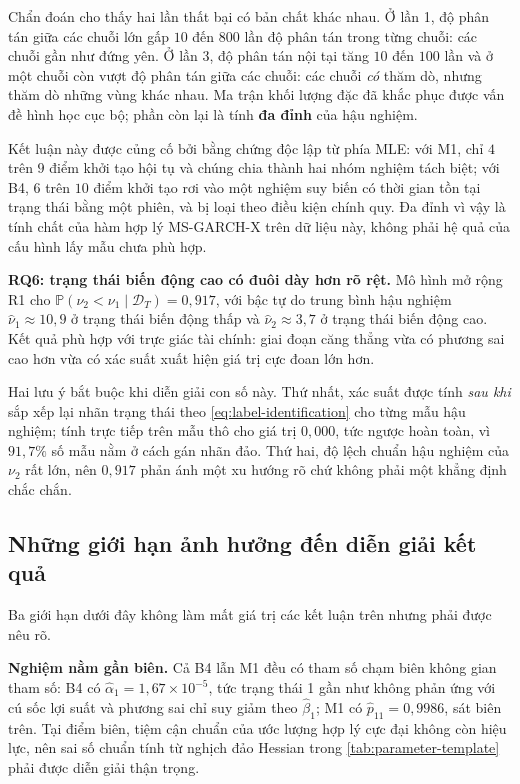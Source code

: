 \documentclass[12pt,a4paper]{article}
\numberwithin{equation}{section}
\newcommand{\Data}{\mathcal{D}}
\newcommand{\Prob}{\mathbb{P}}
\newcommand{\RQ}[1]{\textbf{RQ#1}}
\begin{document}
Chẩn đoán cho thấy hai lần thất bại có bản chất khác nhau. Ở lần 1, độ phân tán giữa các chuỗi lớn gấp $10$ đến $800$ lần độ phân tán trong từng chuỗi: các chuỗi gần như đứng yên. Ở lần 3, độ phân tán nội tại tăng $10$ đến $100$ lần và ở một chuỗi còn vượt độ phân tán giữa các chuỗi: các chuỗi \emph{có} thăm dò, nhưng thăm dò những vùng khác nhau. Ma trận khối lượng đặc đã khắc phục được vấn đề hình học cục bộ; phần còn lại là tính \textbf{đa đỉnh} của hậu nghiệm.

Kết luận này được củng cố bởi bằng chứng độc lập từ phía MLE: với M1, chỉ $4$ trên $9$ điểm khởi tạo hội tụ và chúng chia thành hai nhóm nghiệm tách biệt; với B4, $6$ trên $10$ điểm khởi tạo rơi vào một nghiệm suy biến có thời gian tồn tại trạng thái bằng một phiên, và bị loại theo điều kiện chính quy. Đa đỉnh vì vậy là tính chất của hàm hợp lý MS-GARCH-X trên dữ liệu này, không phải hệ quả của cấu hình lấy mẫu chưa phù hợp.

\textbf{\RQ{6}: trạng thái biến động cao có đuôi dày hơn rõ rệt.} Mô hình mở rộng R1 cho $\Prob(\nu_2<\nu_1\mid\Data_T) = 0{,}917$, với bậc tự do trung bình hậu nghiệm $\hat\nu_1 \approx 10{,}9$ ở trạng thái biến động thấp và $\hat\nu_2 \approx 3{,}7$ ở trạng thái biến động cao. Kết quả phù hợp với trực giác tài chính: giai đoạn căng thẳng vừa có phương sai cao hơn vừa có xác suất xuất hiện giá trị cực đoan lớn hơn.

Hai lưu ý bắt buộc khi diễn giải con số này. Thứ nhất, xác suất được tính \emph{sau khi} sắp xếp lại nhãn trạng thái theo \cref{eq:label-identification} cho từng mẫu hậu nghiệm; tính trực tiếp trên mẫu thô cho giá trị $0{,}000$, tức ngược hoàn toàn, vì $91{,}7\%$ số mẫu nằm ở cách gán nhãn đảo. Thứ hai, độ lệch chuẩn hậu nghiệm của $\nu_2$ rất lớn, nên $0{,}917$ phản ánh một xu hướng rõ chứ không phải một khẳng định chắc chắn.

\subsection{Những giới hạn ảnh hưởng đến diễn giải kết quả}\label{subsec:gioi-han-dien-giai}

Ba giới hạn dưới đây không làm mất giá trị các kết luận trên nhưng phải được nêu rõ.

\textbf{Nghiệm nằm gần biên.} Cả B4 lẫn M1 đều có tham số chạm biên không gian tham số: B4 có $\hat\alpha_1 = 1{,}67\times10^{-5}$, tức trạng thái 1 gần như không phản ứng với cú sốc lợi suất và phương sai chỉ suy giảm theo $\hat\beta_1$; M1 có $\hat p_{11} = 0{,}9986$, sát biên trên. Tại điểm biên, tiệm cận chuẩn của ước lượng hợp lý cực đại không còn hiệu lực, nên sai số chuẩn tính từ nghịch đảo Hessian trong \cref{tab:parameter-template} phải được diễn giải thận trọng.
\end{document}
